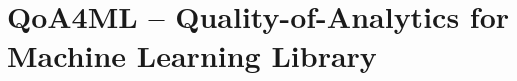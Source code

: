 \documentclass[landscape,a0,final]{a0poster} %
\newcommand{\sectionspace}{10mm} %
\newcommand{\figurespace}{10mm} %
\begin{document}
\begin{minipage}{0.98\linewidth}

\begin{minipage}[t]{0.3\linewidth}
\setlength{\parindent}{10mm} %

\vspace{\sectionspace}



       
       
       
    

\section{QoA4ML -- Quality-of-Analytics for Machine Learning Library}
\begin{center}
    

\end{center}
\end{minipage}
\end{minipage}
\end{document}
